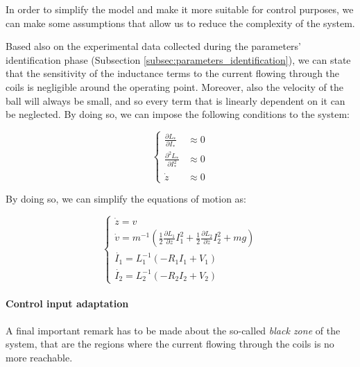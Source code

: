 In order to simplify the model and make it more suitable for control purposes, we can make some assumptions that allow us to reduce the complexity of the system.

Based also on the experimental data collected during the parameters' identification phase (Subsection \ref{subsec:parameters_identification}), we can state that the sensitivity of the inductance terms to the current flowing through the coils is negligible around the operating point.
Moreover, also the velocity of the ball will always be small, and so every term that is linearly dependent on it can be neglected.
By doing so, we can impose the following conditions to the system:

\begin{equation}
    \begin{cases}
        \frac{\partial L_*}{\partial I_*}     & \approx 0 \\
        \frac{\partial^2 L_*}{\partial I_*^2} & \approx 0 \\
        \dot{z}                               & \approx 0
    \end{cases}
    \label{eq:model_reduction_conditions}
\end{equation}

By doing so, we can simplify the equations of motion as:

\begin{equation}
    \begin{cases}
        \dot{z} = v                                                                                                                                 \\
        \dot{v} = m^{-1} \left(\frac{1}{2} \frac{\partial L_1}{\partial z} I_1^2 + \frac{1}{2} \frac{\partial L_2}{\partial z} I_2^2 + m g  \right) \\
        \dot{I_1} = L_1^{-1} \left(- R_1 I_1 + V_1 \right)                                                                                          \\
        \dot{I_2} = L_2^{-1} \left(- R_2 I_2 + V_2 \right)
    \end{cases}
    \label{eq:reduced_equations_of_motion}
\end{equation}

\paragraph{Control input adaptation}

A final important remark has to be made about the so-called \textit{black zone} of the system, that are the regions where the current flowing through the coils is no more reachable.

